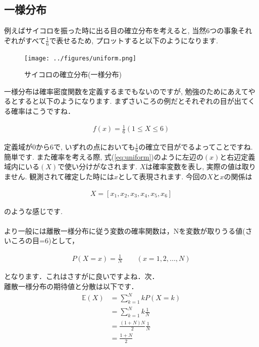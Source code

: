\documentclass[11pt,a4paper,uplatex]{ujreport} 	%
\begin{document}
\subsection{一様分布}
例えばサイコロを振った時に出る目の確立分布を考えると, 当然6つの事象それぞれがすべて$\frac{1}{6}$で表せるため, プロットすると以下のようになります.\\
\begin{figure}[H]
\label{im:uniform}
  \centering
  \texttt{[image: ../figures/uniform.png]}
  \caption{サイコロの確立分布(一様分布)}
\end{figure}

一様分布は確率密度関数を定義するまでもないのですが, 勉強のためにあえてやるとすると以下のようになります. まずさいころの例だとそれぞれの目が出てくる確率はこうですね．

\begin{align}
\label{eq:uniform}
f(x) = \frac{1}{6} (1 \leq X \leq 6)
\end{align}

定義域が0から6で, いずれの点においても$\frac{1}{6}$の確立で目がでるよってことですね. 簡単です. また確率を考える際, 式(\ref{eq:uniform})のように左辺の$(x)$と右辺定義域内にいる$(X)$で使い分けがなされます. $X$は確率変数を表し, 実際の値は取りません. 観測されて確定した時には$x$として表現されます. 今回の$X$と$x$の関係は

\begin{align}
X = [x_1, x_2, x_3, x_4, x_5, x_6]
\end{align}

のような感じです. \\
\\

より一般には離散一様分布に従う変数の確率関数は，Nを変数が取りうる値(さいころの目=6)として，

\begin{align}
P(X=x) = \frac{1}{N} \qquad (x=1,2,...,N)
\end{align}

となります．これはさすがに良いですよね．次．\\

離散一様分布の期待値と分散は以下です．\\

\begin{align}
\mathbb{E}(X) &= \sum_{k=1}^N{kP(X=k)}\\
&=\sum_{k=1}^N{k\frac{1}{N}}\\
&= \frac{(1+N)N}{2}\frac{1}{N}\\
&= \frac{1+N}{2}
\end{align}
\end{document}
